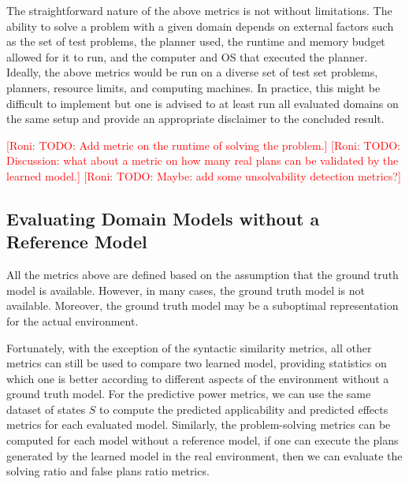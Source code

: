 \documentclass{article}
\theoremstyle{definition}
\theoremstyle{remark}
\newcommand{\roni}[1]{{\textcolor{red}{[Roni: #1]}}}
\begin{document}
The straightforward nature of the above metrics is not without limitations. The ability to solve a problem with a given domain depends on external factors such as the set of test problems, the planner used, the runtime and memory budget allowed for it to run, and the computer and OS that executed the planner. Ideally, the above metrics would be run on a diverse set of test set problems, planners, resource limits, and computing machines. In practice, this might be difficult to implement but one is advised to at least run all evaluated domains on the same setup and provide an appropriate disclaimer to the concluded result. 

\roni{TODO: Add metric on the runtime of solving the problem.}
\roni{TODO: Discussion: what about a metric on how many real plans can be validated by the learned model.}
\roni{TODO: Maybe: add some unsolvability detection metrics?}




\subsection{Evaluating Domain Models without a Reference Model}
All the metrics above are defined based on the assumption that the ground truth model is available. 
However, in many cases, the ground truth model is not available. 
Moreover, the ground truth model may be a suboptimal representation for the actual environment. 

Fortunately, with the exception of the syntactic similarity metrics, all other metrics 
can still be used to compare two learned model,  
providing statistics on which one is better according to different aspects of the environment without a ground truth model. 
For the predictive power metrics, we can use the same dataset of states $S$ to compute the predicted applicability and predicted effects metrics for each evaluated model. Similarly, the problem-solving metrics can be computed for each model without a reference model, if one can execute the plans generated by the learned model in the real environment, then we can evaluate the solving ratio and false plans ratio metrics. 




\end{document}
